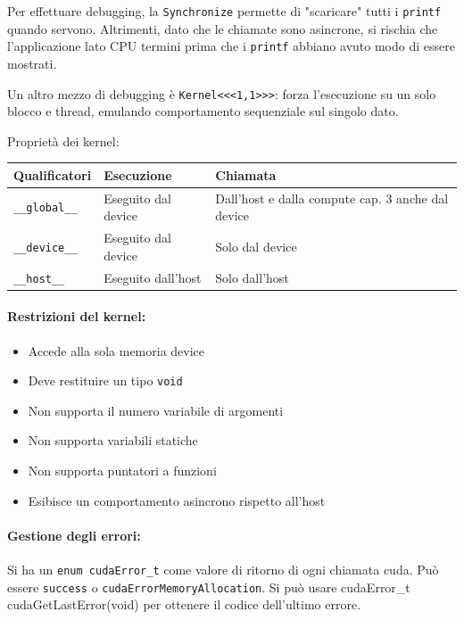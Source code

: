 Per effettuare debugging, la \texttt{Synchronize} permette di "scaricare" tutti i \texttt{printf} quando servono. Altrimenti, dato che le chiamate sono asincrone, si rischia che l'applicazione lato CPU termini prima che i \texttt{printf} abbiano avuto modo di essere mostrati.

Un altro mezzo di debugging è \texttt{Kernel<<<1,1>>>}: forza l'esecuzione su un solo blocco e thread, emulando comportamento sequenziale sul singolo dato.

Proprietà dei kernel: 
\begin{center}
	\begin{tabular}{| l | l | p{4cm} |}
		\hline
		\textbf{Qualificatori} & \textbf{Esecuzione} & \textbf{Chiamata} \\
		\hline
		\texttt{\_\_global\_\_} & Eseguito dal device & Dall’host e dalla compute cap. 3 anche dal device \\
		\hline
		\texttt{\_\_device\_\_} & Eseguito dal device & Solo dal device \\
		\hline
		\texttt{\_\_host\_\_} & Eseguito dall’host & Solo dall’host \\
		\hline
	\end{tabular}
\end{center}

\paragraph{Restrizioni del kernel:}
\begin{itemize}
	\item Accede alla sola memoria device
	
	\item Deve restituire un tipo \texttt{void}
	
	\item Non supporta il numero variabile di argomenti
	
	\item Non supporta variabili statiche
	
	\item Non supporta puntatori a funzioni
	
	\item Esibisce un comportamento asincrono rispetto all'host
\end{itemize}

\paragraph{Gestione degli errori:} Si ha un \texttt{enum cudaError\_t} come valore di ritorno di ogni chiamata cuda. Può essere \texttt{success} o \texttt{cudaErrorMemoryAllocation}. Si può usare {cudaError\_t cudaGetLastError(void)} per ottenere il codice dell'ultimo errore.

